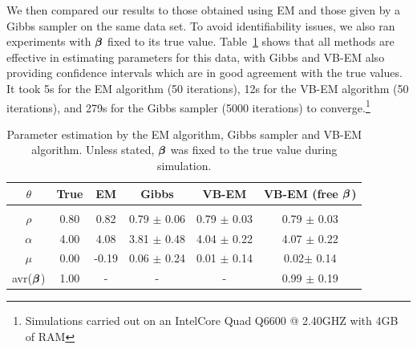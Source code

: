 \documentclass[12pt]{article}
\begin{document}
We then compared our results to those obtained using EM \cite{Smith_2003} and those given by a Gibbs sampler on the same data set. To avoid identifiability issues, we also ran experiments with ${\bm \beta}$ fixed to its true value. Table~\ref{tab:Parest} shows that all methods are
effective in estimating parameters for this data, with Gibbs and VB-EM also providing confidence
intervals which are in good agreement with the true values. It took 5s for the EM algorithm (50 iterations), 12s for the VB-EM algorithm (50 iterations), and 279s for the Gibbs sampler (5000 iterations) to converge.\footnote{Simulations
carried out on an Intel\textregistered Core Quad Q6600 @ 2.40GHZ with 4GB of RAM}
	
\begin{table}[t] \caption{Parameter estimation by the EM algorithm, Gibbs sampler and VB-EM
	algorithm. Unless stated, ${\bm \beta}$ was fixed to the true value during simulation.}
	\label{tab:Parest} \begin{center} \begin{tabular}{c|c|c|c|c|c} $\theta$
		&{\bf True}  	&{\bf EM} &{\bf Gibbs}  &{\bf VB-EM} &{\bf VB-EM} (free ${\bm \beta}$) \\
		\hline &&&  \\[-2ex]
		$\rho$ 		&	0.80	&0.82	  & 0.79 $\pm$ 0.06 & 0.79 $\pm$ 0.03	  &	0.79 $\pm$ 0.03	 \\
		$\alpha$ 	&	4.00		&4.08	  & 3.81 $\pm$ 0.48	 & 4.04 $\pm$ 0.22	  &	4.07 $\pm$ 0.22   \\
		$\mu $		&	0.00	&-0.19	& 0.06 $\pm$ 0.24	 & 0.01 $\pm$ 0.14	&	0.02$\pm$ 0.14	 \\
		avr(${\bm \beta}$)	&	1.00&  -	&         -		&	        -         &	0.99 $\pm$ 0.19	\\
\end{tabular} \end{center}
	\end{table}
\end{document}
